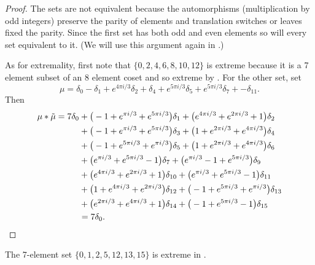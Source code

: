 \begin{proof}
The sets are  not equivalent because the automorphisms 
(multiplication by odd integers) preserve the parity  of
 elements and translation switches or leaves fixed the 
 parity. Since the first set has both odd and even elements
 so will every set equivalent to it. (We will use this argument
 again in .)
 
 As for extremality, first note that $\{0,2,4,6,8,10,12\}$ is extreme because it is a 7 element subset of an 8 element coset
and so extreme by . For the other set, set
 \[\mu = 
  \delta_{0}     -\delta_{1}  +   e^{ 4\pi i  / 3}\delta_{2}  +  \delta_{4}  +   e^{ 5\pi i  / 3}\delta_{5}  +   e^{ 5\pi i  / 3}\delta_{7}  +    -\delta_{11}.
\]
Then
\begin{align*}  \mu*\tilde \mu = 7\delta_{0} &  + \big(  -1 + e^{\pi i / 3}+ e^{ 5 \pi i / 3}\big)\delta_{1}   +  \big( e^{ 4 \pi i / 3}+ e^{ 2 \pi i / 3}+ 1\big)\delta_{2} \\&  +  \big(  -1 + e^{\pi i / 3}+ e^{ 5 \pi i / 3}\big)\delta_{3}   +  \big( 1+ e^{ 2 \pi i / 3}+ e^{ 4 \pi i / 3}\big)\delta_{4} \\&  +  \big(  -1 + e^{ 5 \pi i / 3}+ e^{\pi i / 3}\big)\delta_{5}   +  \big( 1+ e^{ 2 \pi i / 3}+ e^{ 4 \pi i / 3}\big)\delta_{6} \\&  +  \big( e^{\pi i / 3}+ e^{ 5 \pi i / 3}- 1 \big)\delta_{7}   +  \big( e^{\pi i / 3}- 1 + e^{ 5 \pi i / 3}\big)\delta_{9} \\&  +  \big( e^{ 4 \pi i / 3}+ e^{ 2 \pi i / 3}+ 1\big)\delta_{10}   +  \big( e^{\pi i / 3}+ e^{ 5 \pi i / 3}- 1 \big)\delta_{11} \\&  +  \big( 1+ e^{ 4 \pi i / 3}+ e^{ 2 \pi i / 3}\big)\delta_{12}   +  \big(  -1 + e^{ 5 \pi i / 3}+ e^{\pi i / 3}\big)\delta_{13} \\&  +  \big( e^{ 2 \pi i / 3}+ e^{ 4 \pi i / 3}+ 1\big)\delta_{14}   +  \big(  -1 + e^{ 5 \pi i / 3}- 1 \big)\delta_{15} \\&=7\delta_0.
\qedhere
\end{align*}
\end{proof}

\begin{prop}\label{prop7in19} The 7-element set
$\{0,1,2,5,12,13,15\}$ is extreme in .
\end{prop}

